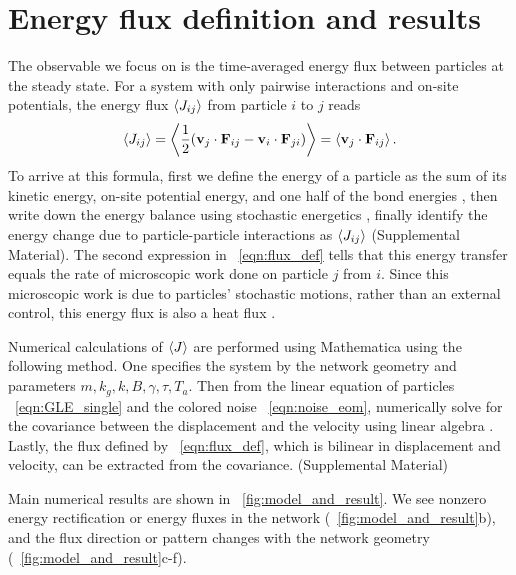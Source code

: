 \documentclass[
 preprint,
 preprintnumbers,
 amsmath,amssymb,
 aps,
 pre,
 longbibliography,
 10pt, twocolumn
]{revtex4-1}
\begin{document}
\section{Energy flux definition and results} \label{sec:flux}
The observable we focus on is the time-averaged energy flux between particles at the steady state. For a system with only pairwise interactions and on-site potentials, the energy flux  $\expval{J_{ij}}$ from particle $i$ to $j$ reads
\begin{equation} \label{eqn:flux_def}
    \expval{J_{ij}} = \expval{\frac{1}{2} (\mathbf{v}_j \cdot \mathbf{F}_{ij} - \mathbf{v}_i \cdot \mathbf{F}_{ji})}
    = \expval{\mathbf{v}_j \cdot \mathbf{F}_{ij}}.
\end{equation}
To arrive at this formula, first we define the energy of a particle as the sum of its kinetic energy, on-site potential energy, and one half of the bond energies \cite{Lepri2003ThermalLattices}, then write down the energy balance using stochastic energetics \cite{Sekimoto1998LangevinThermodynamics}, finally identify the energy change due to particle-particle interactions as $\expval{J_{ij}}$ (Supplemental Material).
The second expression in \eqnname~\eqref{eqn:flux_def} tells that this energy transfer equals the rate of microscopic work done on particle $j$ from $i$.
Since this microscopic work is due to particles' stochastic motions, rather than an external control, this energy flux is also a heat flux \cite{Sekimoto1998LangevinThermodynamics,Lepri2003ThermalLattices}.

Numerical calculations of $\expval{J}$ are performed using Mathematica \cite{WolframResearch2018Mathematica11.3} using the following method. 
One specifies the system by the network geometry and parameters $m, k_g, k, B, \gamma, \tau, T_a$.
Then from the linear equation of particles \eqnname~\eqref{eqn:GLE_single} and the colored noise \eqnname~\eqref{eqn:noise_eom}, numerically solve for the covariance between the displacement and the velocity using linear algebra \cite{Gardiner2009TheEquations,Ceriotti2010Colored-NoiseCarte}.
Lastly, the flux defined by \eqnname~\eqref{eqn:flux_def}, which is bilinear in displacement and velocity, can be extracted from the covariance.
(Supplemental Material)

Main numerical results are shown in \figurename~\ref{fig:model_and_result}. We see nonzero energy rectification or energy fluxes in the network (\figurename~\ref{fig:model_and_result}b), and the flux direction or pattern changes with the network geometry (\figurename~\ref{fig:model_and_result}c-f).
\end{document}
